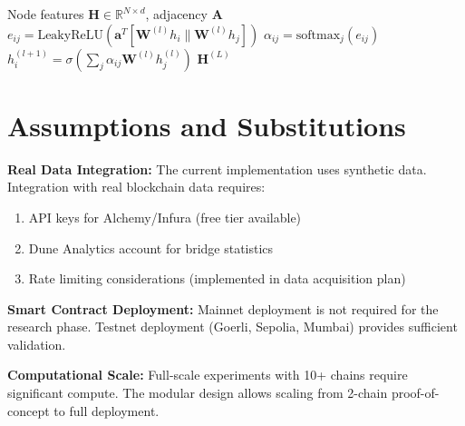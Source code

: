 \documentclass[11pt,a4paper]{article}
\begin{document}
\begin{algorithm}[H]
\caption{ChainGAT Forward Pass}
\begin{algorithmic}[1]
\Require Node features $\mathbf{H} \in \mathbb{R}^{N \times d}$, adjacency $\mathbf{A}$
            \State $e_{ij} = \text{LeakyReLU}(\mathbf{a}^T [\mathbf{W}^{(l)} h_i \| \mathbf{W}^{(l)} h_j])$
        \EndFor
        \State $\alpha_{ij} = \text{softmax}_j(e_{ij})$
        \State $h_i^{(l+1)} = \sigma\left(\sum_j \alpha_{ij} \mathbf{W}^{(l)} h_j^{(l)}\right)$
    \EndFor
\EndFor
\State \Return $\mathbf{H}^{(L)}$
\end{algorithmic}
\end{algorithm}

\section{Assumptions and Substitutions}\label{app:assumptions}

\textbf{Real Data Integration:} The current implementation uses synthetic data. Integration with real blockchain data requires:
\begin{enumerate}[leftmargin=2em]
    \item API keys for Alchemy/Infura (free tier available)
    \item Dune Analytics account for bridge statistics
    \item Rate limiting considerations (implemented in data acquisition plan)
\end{enumerate}

\textbf{Smart Contract Deployment:} Mainnet deployment is not required for the research phase. Testnet deployment (Goerli, Sepolia, Mumbai) provides sufficient validation.

\textbf{Computational Scale:} Full-scale experiments with 10+ chains require significant compute. The modular design allows scaling from 2-chain proof-of-concept to full deployment.
\end{document}
